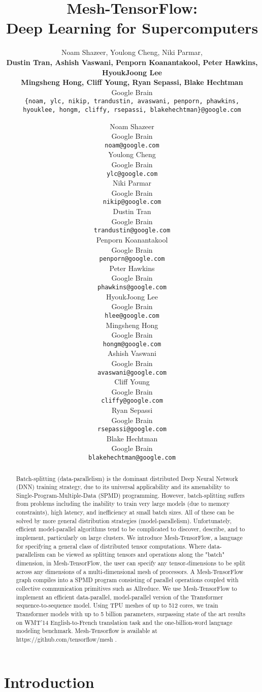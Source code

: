 \documentclass{article}
\title{Mesh-TensorFlow:\\ Deep Learning for Supercomputers}
\author{Noam Shazeer, Youlong Cheng, Niki Parmar,\\
  \textbf{Dustin Tran, Ashish Vaswani, Penporn Koanantakool, Peter Hawkins, HyoukJoong Lee} \\
  \textbf{Mingsheng Hong, Cliff Young, Ryan Sepassi, Blake Hechtman} \\
  Google Brain\\
\texttt{\{noam, ylc, nikip, trandustin, avaswani, penporn, phawkins,}\\
  \texttt{hyouklee, hongm, cliffy, rsepassi, blakehechtman\}@google.com} \\
}
\author{
  Noam Shazeer \\
  Google Brain\\
  \texttt{noam@google.com} \\
  \And
  Youlong Cheng \\
  Google Brain\\
  \texttt{ylc@google.com} \\
  \And
  Niki Parmar \\
  Google Brain\\
  \texttt{nikip@google.com} \\
  \AND
  Dustin Tran \\
  Google Brain\\
  \texttt{trandustin@google.com} \\
  \And
  Penporn Koanantakool \\
  Google Brain\\
  \texttt{penporn@google.com} \\
  \And
  Peter Hawkins \\
  Google Brain\\
  \texttt{phawkins@google.com} \\
  \And
  HyoukJoong Lee \\
  Google Brain\\
  \texttt{hlee@google.com} \\
  \And
  Mingsheng Hong \\
  Google Brain\\
  \texttt{hongm@google.com} \\
  \And
  Ashish Vaswani \\
  Google Brain\\
  \texttt{avaswani@google.com} \\
  \And
  Cliff Young \\
  Google Brain\\
  \texttt{cliffy@google.com} \\
  \And
  Ryan Sepassi \\
  Google Brain\\
  \texttt{rsepassi@google.com} \\
  \And
  Blake Hechtman \\
  Google Brain\\
  \texttt{blakehechtman@google.com} \\
}
\begin{document}
\maketitle

\begin{abstract}

Batch-splitting (data-parallelism) is the dominant distributed Deep Neural Network (DNN) training strategy, due to its universal applicability and its amenability to Single-Program-Multiple-Data (SPMD) programming.  However, batch-splitting suffers from problems including the inability to train very large models (due to memory constraints), high latency, and inefficiency at small batch sizes.  All of these can be solved by more general distribution strategies (model-parallelism).  Unfortunately, efficient model-parallel algorithms tend to be complicated to discover, describe, and to implement, particularly on large clusters.  We introduce Mesh-TensorFlow, a language for specifying a general class of distributed tensor computations.  Where data-parallelism can be viewed as splitting tensors and operations along the "batch" dimension, in Mesh-TensorFlow, the user can specify any tensor-dimensions to be split across any dimensions of a multi-dimensional mesh of processors.  A Mesh-TensorFlow graph compiles into a SPMD program consisting of parallel operations coupled with collective communication primitives such as Allreduce.  We use Mesh-TensorFlow to implement an efficient data-parallel, model-parallel version of the Transformer \cite{Vaswani17} sequence-to-sequence model.  Using TPU meshes of up to 512 cores, we train Transformer models with up to 5 billion parameters, surpassing state of the art results on WMT'14 English-to-French translation task and the one-billion-word language modeling benchmark.  Mesh-Tensorflow is available at https://github.com/tensorflow/mesh .












  
\end{abstract}

\section{Introduction}
\end{document}

